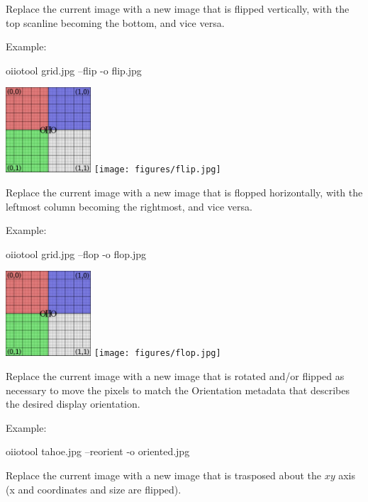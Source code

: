 Replace the current image with a new image that is flipped vertically,
with the top scanline becoming the bottom, and vice versa.

\noindent Example:
\begin{code}
    oiiotool grid.jpg --flip -o flip.jpg
\end{code}
\spc \includegraphics[width=1.25in]{figures/grid-small.jpg} 
\raisebox{40pt}{\large $\rightarrow$}
\texttt{[image: figures/flip.jpg]} \\
\apiend

Replace the current image with a new image that is flopped horizontally,
with the leftmost column becoming the rightmost, and vice versa.

\noindent Example:
\begin{code}
    oiiotool grid.jpg --flop -o flop.jpg
\end{code}
\spc \includegraphics[width=1.25in]{figures/grid-small.jpg} 
\raisebox{40pt}{\large $\rightarrow$}
\texttt{[image: figures/flop.jpg]} \\
\apiend

Replace the current image with a new image that is rotated and/or flipped
as necessary to move the pixels to match the Orientation metadata
that describes the desired display orientation.

\noindent Example:
\begin{code}
    oiiotool tahoe.jpg --reorient -o oriented.jpg
\end{code}
\apiend

Replace the current image with a new image that is trasposed about
the $xy$ axis (x and coordinates and size are flipped).

